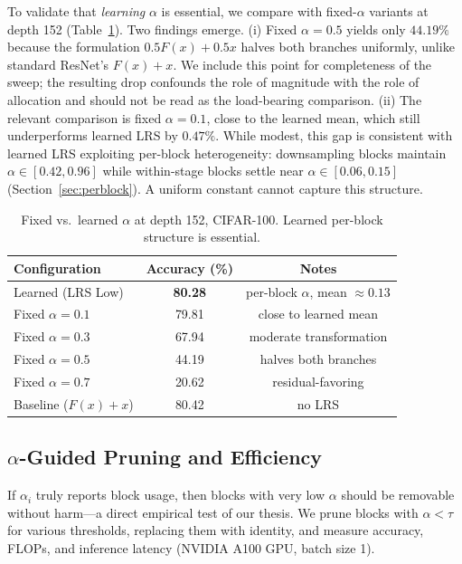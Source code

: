 \documentclass{bmvc2k}
\begin{document}
To validate that \emph{learning} $\alpha$ is essential, we compare with fixed-$\alpha$ variants at depth 152 (Table~\ref{tab:fixed_alpha}). Two findings emerge. (i) Fixed $\alpha = 0.5$ yields only $44.19\%$ because the formulation $0.5 F(x) + 0.5 x$ halves both branches uniformly, unlike standard ResNet's $F(x) + x$. We include this point for completeness of the sweep; the resulting drop confounds the role of magnitude with the role of allocation and should not be read as the load-bearing comparison. (ii) The relevant comparison is fixed $\alpha = 0.1$, close to the learned mean, which still underperforms learned LRS by $0.47\%$. While modest, this gap is consistent with learned LRS exploiting per-block heterogeneity: downsampling blocks maintain $\alpha \in [0.42, 0.96]$ while within-stage blocks settle near $\alpha \in [0.06, 0.15]$ (Section~\ref{sec:perblock}). A uniform constant cannot capture this structure.

\begin{table}[!ht]
\centering
\small
\caption{Fixed vs.\ learned $\alpha$ at depth 152, CIFAR-100. Learned per-block structure is essential.}
\label{tab:fixed_alpha}
\begin{tabular}{lcc}
\toprule
\textbf{Configuration} & \textbf{Accuracy (\%)} & \textbf{Notes} \\
\midrule
Learned (LRS Low) & \textbf{80.28} & per-block $\alpha$, mean $\approx 0.13$ \\
Fixed $\alpha = 0.1$ & 79.81 & close to learned mean \\
Fixed $\alpha = 0.3$ & 67.94 & moderate transformation \\
Fixed $\alpha = 0.5$ & 44.19 & halves both branches \\
Fixed $\alpha = 0.7$ & 20.62 & residual-favoring \\
\midrule
Baseline ($F(x){+}x$) & 80.42 & no LRS \\
\bottomrule
\end{tabular}
\end{table}

\subsection{$\alpha$-Guided Pruning and Efficiency}
\label{sec:pruning}

If $\alpha_i$ truly reports block usage, then blocks with very low $\alpha$ should be removable without harm---a direct empirical test of our thesis. We prune blocks with $\alpha < \tau$ for various thresholds, replacing them with identity, and measure accuracy, FLOPs, and inference latency (NVIDIA A100 GPU, batch size 1).
\end{document}
